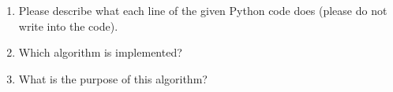 \begin{center}
	\vspace*{-0.5cm}
	\begin{minipage}{0.8\textwidth}
		
	\end{minipage}
\end{center}

\begin{enumerate}
	\item Please describe what each line of the given Python code does (please do not write into the code).
	\item Which algorithm is implemented? 
	\item What is the purpose of this algorithm?
\end{enumerate}

